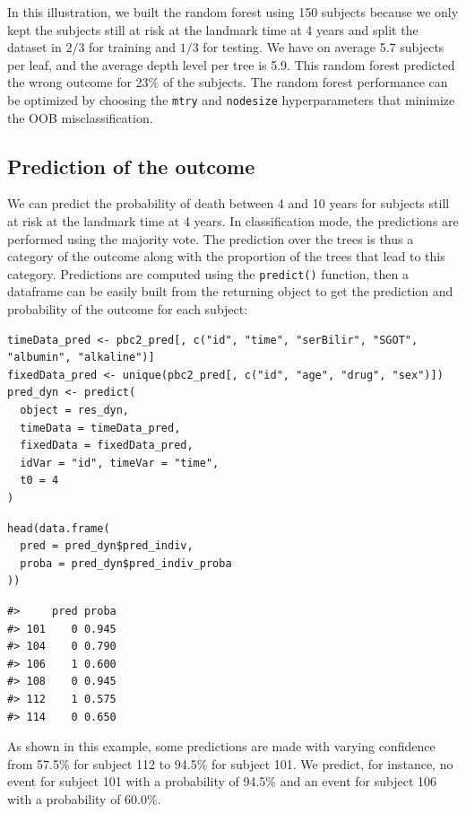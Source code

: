 In this illustration, we built the random forest using 150 subjects because we only kept the subjects still at risk at the landmark time at 4 years and split the dataset in \(2/3\) for training and \(1/3\) for testing. We have on average 5.7 subjects per leaf, and the average depth level per tree is 5.9. This random forest predicted the wrong outcome for 23\% of the subjects. The random forest performance can be optimized by choosing the \texttt{mtry} and \texttt{nodesize} hyperparameters that minimize the OOB misclassification.

\subsection{Prediction of the outcome}\label{prediction-of-the-outcome}

We can predict the probability of death between 4 and 10 years for subjects still at risk at the landmark time at 4 years. In classification mode, the predictions are performed using the majority vote. The prediction over the trees is thus a category of the outcome along with the proportion of the trees that lead to this category. Predictions are computed using the \texttt{predict()} function, then a dataframe can be easily built from the returning object to get the prediction and probability of the outcome for each subject:

\begin{verbatim}
timeData_pred <- pbc2_pred[, c("id", "time", "serBilir", "SGOT", "albumin", "alkaline")]
fixedData_pred <- unique(pbc2_pred[, c("id", "age", "drug", "sex")])
pred_dyn <- predict(
  object = res_dyn,
  timeData = timeData_pred,
  fixedData = fixedData_pred,
  idVar = "id", timeVar = "time",
  t0 = 4
)
\end{verbatim}

\begin{verbatim}
head(data.frame(
  pred = pred_dyn$pred_indiv,
  proba = pred_dyn$pred_indiv_proba
))
\end{verbatim}

\begin{verbatim}
#>     pred proba
#> 101    0 0.945
#> 104    0 0.790
#> 106    1 0.600
#> 108    0 0.945
#> 112    1 0.575
#> 114    0 0.650
\end{verbatim}

As shown in this example, some predictions are made with varying confidence from 57.5\% for subject 112 to 94.5\% for subject 101. We predict, for instance, no event for subject 101 with a probability of 94.5\% and an event for subject 106 with a probability of 60.0\%.

